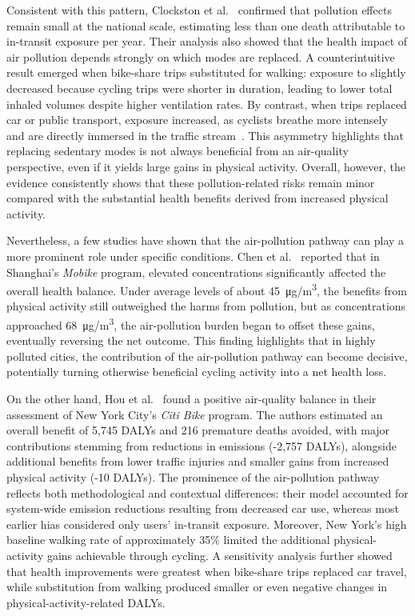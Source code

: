     
    Consistent with this pattern, Clockston et al.~\cite{Clockston2021} confirmed that pollution effects remain small at the national scale, estimating less than one death attributable to in-transit  exposure per year. Their analysis also showed that the health impact of air pollution depends strongly on which modes are replaced. A counterintuitive result emerged when bike-share trips substituted for walking: exposure to  slightly decreased because cycling trips were shorter in duration, leading to lower total inhaled volumes despite higher ventilation rates. By contrast, when trips replaced car or public transport, exposure increased, as cyclists breathe more intensely and are directly immersed in the traffic stream~\cite{Rojas-Rueda2011, Otero2018, Clockston2021}. This asymmetry highlights that replacing sedentary modes is not always beneficial from an air-quality perspective, even if it yields large gains in physical activity. Overall, however, the evidence consistently shows that these pollution-related risks remain minor compared with the substantial health benefits derived from increased physical activity.

    Nevertheless, a few studies have shown that the air-pollution pathway can play a more prominent role under specific conditions. Chen et al.~\cite{Chen2023} reported that in Shanghai’s \textit{Mobike} program, elevated  concentrations significantly affected the overall health balance. Under average levels of about 45~\si{\micro g/m^3}, the benefits from physical activity still outweighed the harms from pollution, but as concentrations approached 68~\si{\micro g/m^3}, the air-pollution burden began to offset these gains, eventually reversing the net outcome. This finding highlights that in highly polluted cities, the contribution of the air-pollution pathway can become decisive, potentially turning otherwise beneficial cycling activity into a net health loss.
    
    On the other hand, Hou et al.~\cite{Hou2022} found a positive air-quality balance in their assessment of New York City’s \textit{Citi Bike} program. The authors estimated an overall benefit of 5,745 DALYs and 216 premature deaths avoided, with major contributions stemming from reductions in  emissions (-2,757 DALYs), alongside additional benefits from lower traffic injuries and smaller gains from increased physical activity (-10 DALYs). The prominence of the air-pollution pathway reflects both methodological and contextual differences: their model accounted for system-wide emission reductions resulting from decreased car use, whereas most earlier \acp{hia} considered only users’ in-transit exposure. Moreover, New York’s high baseline walking rate of approximately 35\% limited the additional physical-activity gains achievable through cycling. A sensitivity analysis further showed that health improvements were greatest when bike-share trips replaced car travel, while substitution from walking produced smaller or even negative changes in physical-activity-related DALYs.

